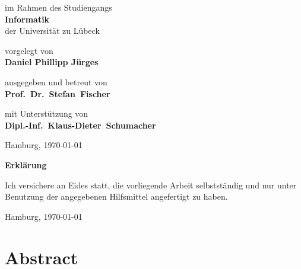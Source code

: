 \begin{titlepage}
{	\titlepageskip
	im Rahmen des Studiengangs\\
	{\bf Informatik}\\
	der Universität zu Lübeck

	\titlepageskip
	vorgelegt von\\
	{\bf Daniel Phillipp Jürges}

	\titlepageskip
	ausgegeben und betreut von\\
	{\bf Prof.~Dr.~Stefan~Fischer}

	\titlepageskip
	{
		mit Unterstützung von\\
		{\bf Dipl.-Inf.~Klaus-Dieter~Schumacher}\\
	}


	\vfill 
	{
		Hamburg, \today %
	}
}
\end{titlepage}
\restoregeometry

\cleardoublepage

\newpage
\vspace*{7cm}
\centerline{\bf Erklärung}

\vspace*{1cm}
Ich versichere an Eides statt, die vorliegende Arbeit selbstständig und nur unter Benutzung
der angegebenen Hilfsmittel angefertigt zu haben.

\vspace*{3cm}
Hamburg, \today %

\pagestyle{headings}

\cleardoublepage


\section*{Abstract}


